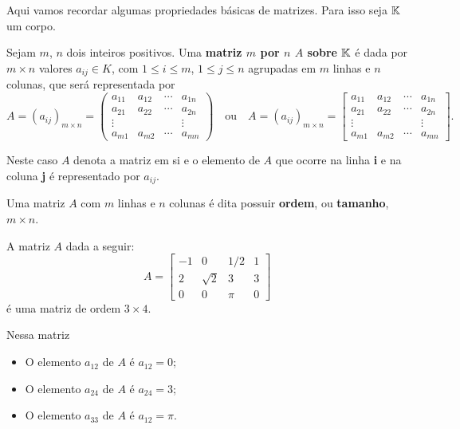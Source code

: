 Aqui vamos recordar algumas propriedades b\'asicas de matrizes. Para isso seja $\mathbb{K}$ um corpo.

Sejam $m$, $n$ dois inteiros positivos. Uma \textbf{matriz $m$ por $n$ $A$ sobre $\mathbb{K}$} \'e dada por $m \times n$ valores $a_{ij} \in K$, com $1 \le i \le m$, $1 \le j \le n$ agrupadas em $m$ linhas e $n$ colunas, que ser\'a representada por
\[
	A = (a_{ij})_{m\times n} = \begin{pmatrix}
		a_{11} & a_{12} & \cdots & a_{1n}\\
		a_{21} & a_{22} & \cdots & a_{2n}\\
		\vdots & & & \vdots\\
		a_{m1} & a_{m2} & \cdots & a_{mn}
	\end{pmatrix} \quad\mbox{ou}\quad
	A = (a_{ij})_{m\times n} = \begin{bmatrix}
		a_{11} & a_{12} & \cdots & a_{1n}\\
		a_{21} & a_{22} & \cdots & a_{2n}\\
		\vdots & & & \vdots\\
		a_{m1} & a_{m2} & \cdots & a_{mn}
	\end{bmatrix}.
\]

Neste caso $A$ denota a matriz em si e o elemento de $A$ que ocorre na linha \textbf{i} e na coluna \textbf{j} é representado por $a_{ij}$.

Uma matriz $A$ com $m$ linhas e $n$ colunas é dita possuir \textbf{ordem}, ou \textbf{tamanho}, $m \times n$.

\begin{exemplo}
	A matriz $A$ dada a seguir:
	\[
		A = \begin{bmatrix}
			-1 & 0 & 1/2 & 1\\
			2 & \sqrt{2} & 3 & 3\\
			0 & 0 & \pi & 0
		\end{bmatrix}
	\]
	é uma matriz de ordem $3 \times 4$.

	Nessa matriz
	\begin{itemize}
		\item O elemento $a_{12}$ de $A$ é $a_{12} = 0$;

		\item O elemento $a_{24}$ de $A$ é $a_{24} = 3$;

		\item O elemento $a_{33}$ de $A$ é $a_{12} = \pi$.
	\end{itemize}
\end{exemplo}

